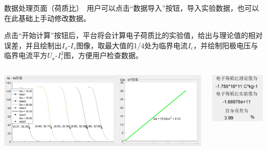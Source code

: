 \documentclass{beamer}
\begin{document}
    \begin{frame}{数据处理页面（荷质比）}{\thesection \, \secname}
    用户可以点击“数据导入”按钮，导入实验数据，也可以在此基础上手动修改数据。

    点击“开始计算”按钮后，平台将会计算电子荷质比的实验值，给出与理论值的相对误差，并且绘制出$I_a$-$I_s$图像，取最大值的1/4处为临界电流$I_c$，并绘制阳极电压与临界电流平方$U_a$-$I_c^2$图，方便用户检查数据。

        \begin{columns}
            \begin{column}{0.4\textwidth}
                \includegraphics[scale=0.27]{gallery/pic8.jpg}
            \end{column}
            \begin{column}{0.4\textwidth}
                \includegraphics[scale=0.8]{gallery/pic9.jpg}
            \end{column}
        \end{columns}
    \end{frame}
\end{document}
